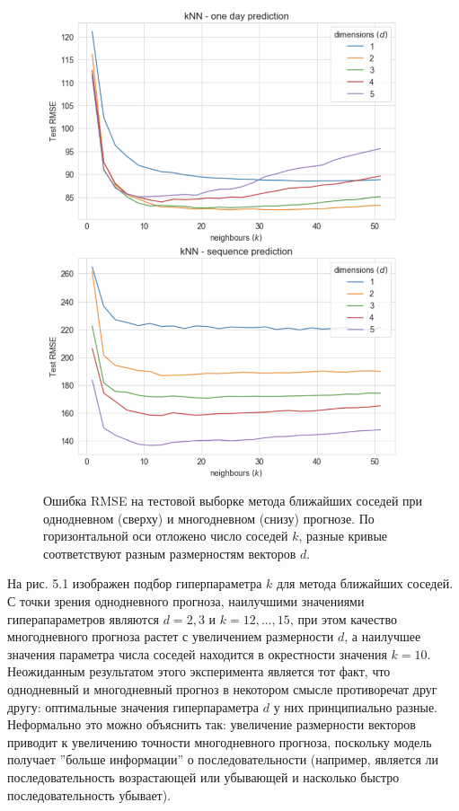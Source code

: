 \documentclass[a4paper, 12pt]{article}
\begin{document}
\begin{figure}[H]
    \centering
    \includegraphics[width=11cm]{knn_rmse.png}
    \caption{Ошибка RMSE на тестовой выборке метода ближайших соседей при однодневном (сверху) и многодневном (снизу) прогнозе. По горизонтальной оси отложено число соседей $k$, разные кривые соответствуют разным размерностям векторов $d$.}
    \label{fig:my_label}
\end{figure}

На рис. 5.1 изображен подбор гиперпараметра $k$ для метода ближайших соседей. С точки зрения однодневного прогноза, наилучшими значениями гиперапараметров являются $d=2, 3$ и $k = 12, ..., 15$, при этом качество многодневного прогноза растет с увеличением размерности $d$, а наилучшее значения параметра числа соседей находится в окрестности значения $k=10$. Неожиданным результатом этого эксперимента является тот факт, что однодневный и многодневный прогноз в некотором смысле противоречат друг другу: оптимальные значения гиперпараметра $d$ у них принципиально разные. Неформально это можно объяснить так: увеличение размерности векторов приводит к увеличению точности многодневного прогноза, поскольку модель получает ''больше информации'' о последовательности (например, является ли последовательность возрастающей или убывающей и насколько быстро последовательность убывает).
\end{document}
